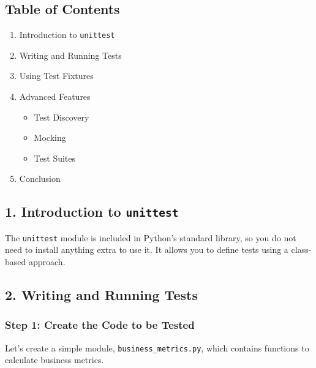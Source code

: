 \documentclass[
  letterpaper,
  DIV=11,
  numbers=noendperiod]{scrreprt}
\providecommand{\tightlist}{%
  \setlength{\itemsep}{0pt}\setlength{\parskip}{0pt}}\usepackage{longtable,booktabs,array}
\begin{document}
\subsection{Table of Contents}\label{table-of-contents-10}

\begin{enumerate}
\def\labelenumi{\arabic{enumi}.}
\tightlist
\item
  Introduction to \texttt{unittest}
\item
  Writing and Running Tests
\item
  Using Test Fixtures
\item
  Advanced Features

  \begin{itemize}
  \tightlist
  \item
    Test Discovery
  \item
    Mocking
  \item
    Test Suites
  \end{itemize}
\item
  Conclusion
\end{enumerate}

\subsection{\texorpdfstring{1. Introduction to
\texttt{unittest}}{1. Introduction to unittest}}\label{introduction-to-unittest}

The \texttt{unittest} module is included in Python's standard library,
so you do not need to install anything extra to use it. It allows you to
define tests using a class-based approach.

\subsection{2. Writing and Running
Tests}\label{writing-and-running-tests}

\subsubsection{Step 1: Create the Code to be
Tested}\label{step-1-create-the-code-to-be-tested}

Let's create a simple module, \texttt{business\_metrics.py}, which
contains functions to calculate business metrics.
\end{document}
